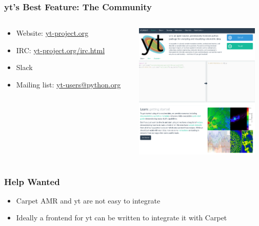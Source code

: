 \documentclass[]{beamer}
\begin{document}
\begin{frame}
  \frametitle{yt's Best Feature: The Community}
  \begin{columns}
    \begin{column}{6cm}
      \begin{itemize}
      \item Website: \url{yt-project.org}
      \item IRC: \url{yt-project.org/irc.html}
      \item Slack
      \item Mailing list: \href{mailto:yt-users@python.org}{yt-users@python.org}
      \end{itemize}      
    \end{column}
    \begin{column}{6cm}
      \begin{center}
        \includegraphics[width=6cm]{figures/yt-page}
      \end{center}
    \end{column}
  \end{columns}
\end{frame}

\begin{frame}
  \frametitle{Help Wanted}
  \begin{itemize}
  \item Carpet AMR and yt are not easy to integrate
  \item Ideally a frontend for yt can be written to integrate it with Carpet
  \end{itemize}
\end{frame}
\end{document}
